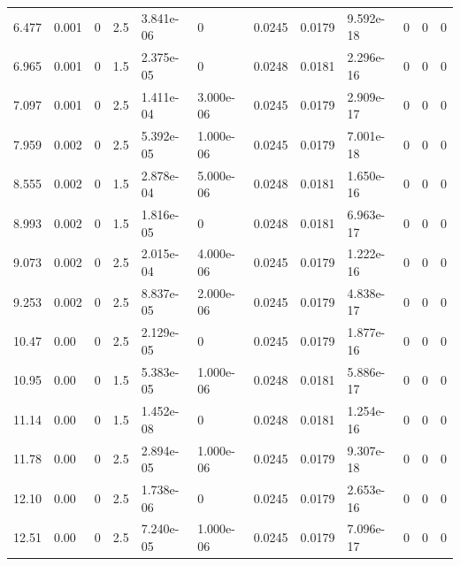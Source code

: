 \documentclass[preview]{standalone}
\begin{document}
{{\begin{tabular}{L{1.2cm}C{1.2cm} C{0.3cm}C{0.5cm} C{1.4cm}C{1.4cm} C{1.4cm}C{1.4cm} C{1.6cm}C{1.6cm} C{1.6cm}C{1.6cm}}
  6.477  &  0.001  & 0     & 2.5 &  3.841e-06  & 0  &  0.0245&   0.0179& 9.592e-18 & 0   &  0 & 0  \\ 
  6.965  &  0.001  & 0     & 1.5 &  2.375e-05  & 0  &  0.0248&   0.0181& 2.296e-16 & 0   &  0 & 0  \\ 
  7.097  &  0.001  & 0     & 2.5 &  1.411e-04  & 3.000e-06  &  0.0245&   0.0179& 2.909e-17 & 0   &  0 & 0  \\ 
  7.959  &  0.002  & 0     & 2.5 &  5.392e-05  & 1.000e-06  &  0.0245&   0.0179& 7.001e-18 & 0   &  0 & 0  \\ 
  8.555  &  0.002  & 0     & 1.5 &  2.878e-04  & 5.000e-06  &  0.0248&   0.0181& 1.650e-16 & 0   &  0 & 0  \\ 
  8.993  &  0.002  & 0     & 1.5 &  1.816e-05  & 0  &  0.0248&   0.0181& 6.963e-17 & 0   &  0 & 0  \\ 
  9.073  &  0.002  & 0     & 2.5 &  2.015e-04  & 4.000e-06  &  0.0245&   0.0179& 1.222e-16 & 0   &  0 & 0  \\ 
  9.253  &  0.002  & 0     & 2.5 &  8.837e-05  & 2.000e-06  &  0.0245&   0.0179& 4.838e-17 & 0   &  0 & 0  \\ 
  10.47  &  0.00  & 0     & 2.5 &  2.129e-05  & 0  &  0.0245&   0.0179& 1.877e-16 & 0   &  0 & 0  \\ 
  10.95  &  0.00  & 0     & 1.5 &  5.383e-05  & 1.000e-06  &  0.0248&   0.0181& 5.886e-17 & 0   &  0 & 0  \\ 
  11.14  &  0.00  & 0     & 1.5 &  1.452e-08  & 0  &  0.0248&   0.0181& 1.254e-16 & 0   &  0 & 0  \\ 
  11.78  &  0.00  & 0     & 2.5 &  2.894e-05  & 1.000e-06  &  0.0245&   0.0179& 9.307e-18 & 0   &  0 & 0  \\ 
  12.10  &  0.00  & 0     & 2.5 &  1.738e-06  & 0  &  0.0245&   0.0179& 2.653e-16 & 0   &  0 & 0  \\ 
  12.51  &  0.00  & 0     & 2.5 &  7.240e-05  & 1.000e-06  &  0.0245&   0.0179& 7.096e-17 & 0   &  0 & 0  \\ 
\hline 
\end{tabular} 

}}
\end{document}
